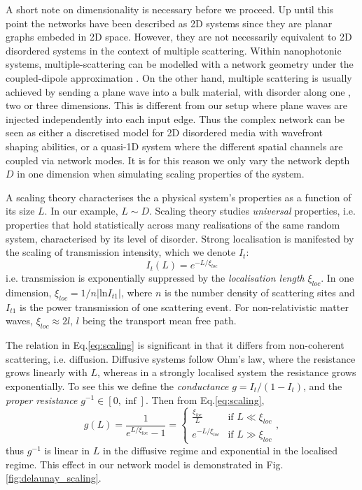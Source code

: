 A short note on dimensionality is necessary before we proceed. Up until this point the networks have been described as 2D systems since they are planar graphs embeded in 2D space. However, they are not necessarily equivalent to 2D disordered systems in the context of multiple scattering. Within nanophotonic systems, multiple-scattering can be modelled with a network geometry under the coupled-dipole approximation \cite{Yurkin2007}. On the other hand, multiple scattering is usually achieved by sending a plane wave into a bulk material, with disorder along one \cite{Sheinfux2017}, two \cite{Schwartz2007} or three \cite{Wiersma1997} dimensions. This is different from our setup where plane waves are injected independently into each input edge. Thus the complex network can be seen as either a discretised model for 2D disordered media with wavefront shaping abilities, or a quasi-1D system where the different spatial channels are coupled via network modes. It is for this reason we only vary the network depth $D$ in one dimension when simulating scaling properties of the system.

A scaling theory characterises the a physical system's properties as a function of its size $L$. In our example, $L \sim D$. Scaling theory studies \textit{universal} properties, i.e. properties that hold statistically across many realisations of the same random system, characterised by its level of disorder. Strong localisation is manifested by the scaling of transmission intensity, which we denote $I_t$:
\begin{equation}
    \label{eq:scaling}
    I_t(L) = e^{-L/\xi_{loc}}
\end{equation}
i.e. transmission is exponentially suppressed by the \textit{localisation length} $\xi_{loc}$. In one dimension, $\xi_{loc}=1/n|\textrm{ln}I_{t1}|$, where $n$ is the number density of scattering sites and $I_{t1}$ is the power transmission of one scattering event. For non-relativistic matter waves, $\xi_{loc} \approx 2l$, $l$ being the transport mean free path. \cite{Muller2011}

The relation in Eq.\ref{eq:scaling} is significant in that it differs from non-coherent scattering, i.e. diffusion. Diffusive systems follow Ohm's law, where the resistance grows linearly with $L$, whereas in a strongly localised system the resistance grows exponentially. To see this we define the \textit{conductance} $g=I_t/(1-I_t)$, and the \textit{proper resistance} $g^{-1} \in [0, \inf]$. Then from Eq.\ref{eq:scaling},
\begin{equation}
    \label{eq:scaling_conductance}
    g(L) = \frac{1}{e^{L/\xi_{loc}} - 1} = \begin{cases} 
   \frac{\xi_{loc}}{L} & \text{if } L\ll \xi_{loc} \\
   e^{-L/\xi_{loc}}       & \text{if } L\gg \xi_{loc}
  \end{cases},
\end{equation}
thus $g^{-1}$ is linear in $L$ in the diffusive regime and exponential in the localised regime. This effect in our network model is demonstrated in Fig.\ref{fig:delaunay_scaling}.


